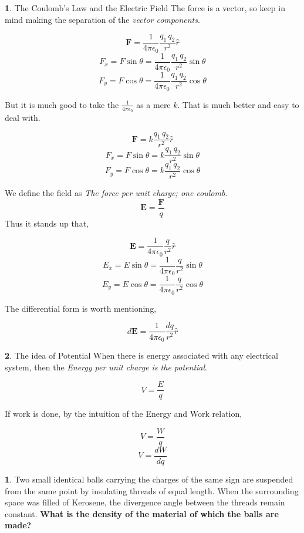 \documentclass[11pt,a4paper,twocolumn]{article}
\renewcommand{\vec}[1]{\boldsymbol{#1}}
\theoremstyle{definition}
\newtheorem{fct}{ \framebox[0.05\textwidth]{Fact} }
\theoremstyle{definition}
\newtheorem{pr}{ \framebox[0.05\textwidth]{Pr} }
\theoremstyle{definition}
\theoremstyle{definition}
\begin{document}
\begin{fct}
\textsf{The Coulomb's Law and the Electric Field}
The force is a vector, so keep in mind making the separation of the \emph{vector components}.


\[ \vec{F} = \frac{1}{4 \pi \epsilon_0} \frac{q_1 \, q_2}{r^2} \hat{r} \]
\[ F_x = F \sin \theta  = \frac{1}{4 \pi \epsilon_0} \frac{q_1 \, q_2}{r^2} \sin \theta \]
\[ F_y = F \cos \theta = \frac{1}{4 \pi \epsilon_0} \frac{q_1 \, q_2}{r^2} \cos \theta \]

But it is much good to take the $\frac{1}{4 \pi \epsilon_0}$ as a mere $k$. That is much better and easy to deal with.

\[ \vec{F} = k \frac{q_1 \, q_2}{r^2} \hat{r} \]
\[ F_x = F \sin \theta  = k \frac{q_1 \, q_2}{r^2} \sin \theta \]
\[ F_y = F \cos \theta = k \frac{q_1 \, q_2}{r^2} \cos \theta \]

We define the field as \emph{The force per unit charge; one coulomb}.
\[ \vec{E} = \frac{\vec{F}}{q} \]
Thus it stands up that, 

\[ \vec{E} = \frac{1}{4 \pi \epsilon_0} \frac{q}{r^2} \hat{r} \]
\[ E_x = E \sin \theta  = \frac{1}{4 \pi \epsilon_0} \frac{q}{r^2} \sin \theta \]
\[ E_y = E \cos \theta = \frac{1}{4 \pi \epsilon_0} \frac{q}{r^2} \cos \theta \]

The differential form is worth mentioning,

\[ d\vec{E} = \frac{1}{4 \pi \epsilon_0} \frac{dq}{r^2} \hat{r} \] 

\end{fct}
\begin{fct} 
\textsf{The idea of Potential}
When there is energy associated with any electrical system, then the \emph{Energy per unit charge is the potential}.

\[ V = \frac{E}{q} \]

If work is done, by the intuition of the Energy and Work relation, 

\[ V = \frac{W}{q} \]
\[ V = \frac{dW}{dq} \]
\end{fct} 

\begin{pr}
Two small identical balls carrying the charges of the same sign are suspended from the same point by insulating threads of equal length. When the surrounding space was filled of Kerosene, the divergence angle between the threads remain constant. \textbf{What is the density of the material of which the balls are made?}
\end{pr}
\end{document}
